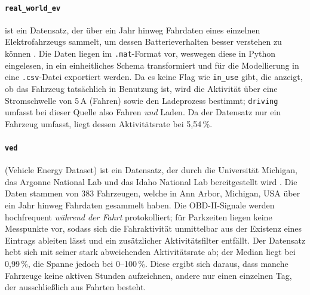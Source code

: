 \paragraph{\texttt{real\_world\_ev}} ist ein Datensatz, der über ein Jahr hinweg Fahrdaten eines einzelnen Elektrofahrzeugs sammelt, um dessen Batterieverhalten besser verstehen zu können \parencite{pozzato2023fielddata}. Die Daten liegen im \texttt{.mat}-Format vor, weswegen diese in Python eingelesen, in ein einheitliches Schema transformiert und für die Modellierung in eine \texttt{.csv}-Datei exportiert werden. Da es keine Flag wie \texttt{in\_use} gibt, die anzeigt, ob das Fahrzeug tatsächlich in Benutzung ist, wird die Aktivität über eine Stromschwelle von 5\,A (Fahren) sowie den Ladeprozess bestimmt; \texttt{driving} umfasst bei dieser Quelle also Fahren \emph{und} Laden. Da der Datensatz nur ein Fahrzeug umfasst, liegt dessen Aktivitätsrate bei 5,54\,\%.

\paragraph{\texttt{ved}} (Vehicle Energy Dataset) ist ein Datensatz, der durch die Universität Michigan, das Argonne National Lab und das Idaho National Lab bereitgestellt wird \parencite{oh2022ved}. Die Daten stammen von 383 Fahrzeugen, welche in Ann Arbor, Michigan, USA über ein Jahr hinweg Fahrdaten gesammelt haben. Die OBD-II-Signale werden hochfrequent \emph{während der Fahrt} protokolliert; für Parkzeiten liegen keine Messpunkte vor, sodass sich die Fahraktivität unmittelbar aus der Existenz eines Eintrags ableiten lässt und ein zusätzlicher Aktivitätsfilter entfällt. Der Datensatz hebt sich mit seiner stark abweichenden Aktivitätsrate ab; der Median liegt bei 0,99\,\%, die Spanne jedoch bei 0--100\,\%. Diese ergibt sich daraus, dass manche Fahrzeuge keine aktiven Stunden aufzeichnen, andere nur einen einzelnen Tag, der ausschließlich aus Fahrten besteht.

